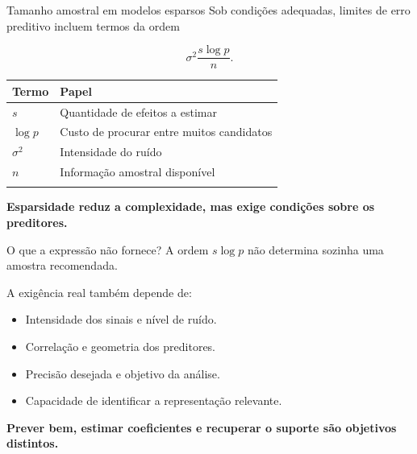 \documentclass[
  10pt,
  ignorenonframetext,
  aspectratio=169,
  brazilian,
]{beamer}
\newcounter{none} %
\providecommand{\tightlist}{%
  \setlength{\itemsep}{0pt}\setlength{\parskip}{0pt}}
\begin{document}
\begin{frame}{Tamanho amostral em modelos esparsos}
\protect{}\label{tamanho-amostral-em-modelos-esparsos}
Sob condições adequadas, limites de erro preditivo incluem termos da
ordem

\[
\boxed{\sigma^2\frac{s\log p}{n}.}
\]

{\def\LTcaptype{none} %
\begin{longtable}[]{@{}ll@{}}
\toprule\noalign{}
Termo & Papel \\
\midrule\noalign{}
\endhead
\(s\) & Quantidade de efeitos a estimar \\
\(\log p\) & Custo de procurar entre muitos candidatos \\
\(\sigma^2\) & Intensidade do ruído \\
\(n\) & Informação amostral disponível \\
\bottomrule\noalign{}
\end{longtable}
}

\textbf{Esparsidade reduz a complexidade, mas exige condições sobre os
preditores.}

\end{frame}

\begin{frame}{O que a expressão não fornece?}
\protect{}\label{o-que-a-expressuxe3o-nuxe3o-fornece}
A ordem \(s\log p\) não determina sozinha uma amostra recomendada.

A exigência real também depende de:

\begin{itemize}
\tightlist
\item
  Intensidade dos sinais e nível de ruído.
\item
  Correlação e geometria dos preditores.
\item
  Precisão desejada e objetivo da análise.
\item
  Capacidade de identificar a representação relevante.
\end{itemize}

\textbf{Prever bem, estimar coeficientes e recuperar o suporte são
objetivos distintos.}
\end{frame}
\end{document}
